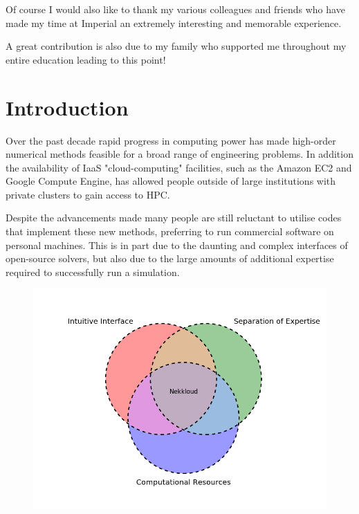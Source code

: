 \documentclass[11pt, a4paper]{report}
\begin{document}
Of course I would also like to thank my various colleagues and friends who have made my time at Imperial an extremely interesting and memorable experience.

A great contribution is also due to my family who supported me throughout my entire education leading to this point!
\newpage

\newpage
\tableofcontents
\printnomenclature
\newpage
\listoffigures

\listoftables
\newpage
\chapter{Introduction}
Over the past decade rapid progress in computing power has made high-order numerical methods feasible for a broad range of engineering problems. In addition the availability of IaaS "cloud-computing" facilities, such as the Amazon EC2\cite{Amazon_2013} and Google Compute Engine\cite{Google2015}, has allowed people outside of large institutions with private clusters to gain access to HPC.

Despite the advancements made many people are still reluctant to utilise codes that implement these new methods, preferring to run commercial software on personal machines. This is in part due to the daunting and complex interfaces of open-source solvers, but also due to the large amounts of additional expertise required to successfully run a simulation.

\begin{figure}[htb!]
 \centering
 \includegraphics[width=.75\linewidth,  clip=true, trim = .4cm .4cm .4cm .4cm]{venn_diagram}
 \label{fig:venn_diagram}
\end{figure}
\end{document}
